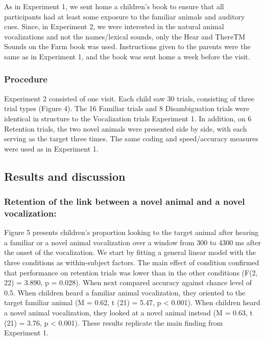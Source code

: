 \documentclass[english,floatsintext,man]{apa6}
\theoremstyle{definition}
\theoremstyle{definition}
\theoremstyle{definition}
\theoremstyle{remark}
\begin{document}
As in Experiment 1, we sent home a children's book to ensure that all
participants had at least some exposure to the familiar animals and
auditory cues. Since, in Experiment 2, we were interested in the natural
animal vocalizations and not the names/lexical sounds, only the Hear and
ThereTM Sounds on the Farm book was used. Instructions given to the
parents were the same as in Experiment 1, and the book was sent home a
week before the visit.

\subsubsection{Procedure}\label{procedure-1}

Experiment 2 consisted of one visit. Each child saw 30 trials,
consisting of three trial types (Figure 4). The 16 Familiar trials and 8
Disambiguation trials were identical in structure to the Vocalization
trials Experiment 1. In addition, on 6 Retention trials, the two novel
animals were presented side by side, with each serving as the target
three times. The same coding and speed/accuracy measures were used as in
Experiment 1.

\subsection{Results and discussion}\label{results-and-discussion-1}

\subsubsection{Retention of the link between a novel animal and a novel
vocalization:}\label{retention-of-the-link-between-a-novel-animal-and-a-novel-vocalization}

Figure 5 presents children's proportion looking to the target animal
after hearing a familiar or a novel animal vocalization over a window
from 300 to 4300 ms after the onset of the vocalization. We start by
fitting a general linear model with the three conditions as
within-subject factors. The main effect of condition confirmed that
performance on retention trials was lower than in the other conditions
(F(2, 22) = 3.890, p = 0.028). When next compared accuracy against
chance level of 0.5. When children heard a familiar animal vocalization,
they oriented to the target familiar animal (M = 0.62, t (21) = 5.47, p
\textless{} 0.001). When children heard a novel animal vocalization,
they looked at a novel animal instead (M = 0.63, t (21) = 3.76, p
\textless{} 0.001). These results replicate the main finding from
Experiment 1.
\end{document}
